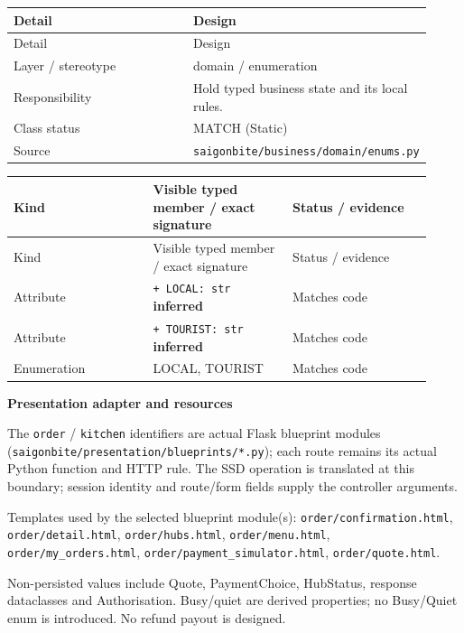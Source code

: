 \begin{longtable}{>{\raggedright\arraybackslash}p{0.4600\linewidth}>{\raggedright\arraybackslash}p{0.4600\linewidth}}
Detail & Design \\
\hline\endfirsthead
Detail & Design \\
\hline\endhead
Layer / stereotype & domain / \guillemotleft{}enumeration\guillemotright{} \\
Responsibility & Hold typed business state and its local rules. \\
Class status & MATCH (Static) \\
Source & \texttt{saigonbite/\allowbreak{}business/\allowbreak{}domain/\allowbreak{}enums.\allowbreak{}py} \\
\end{longtable}
\begin{longtable}{>{\raggedright\arraybackslash}p{0.3067\linewidth}>{\raggedright\arraybackslash}p{0.3067\linewidth}>{\raggedright\arraybackslash}p{0.3067\linewidth}}
Kind & Visible typed member / exact signature & Status / evidence \\
\hline\endfirsthead
Kind & Visible typed member / exact signature & Status / evidence \\
\hline\endhead
Attribute & \texttt{+ LOCAL: str} \textbf{inferred} & Matches code \\
Attribute & \texttt{+ TOURIST: str} \textbf{inferred} & Matches code \\
Enumeration & LOCAL, TOURIST & Matches code \\
\end{longtable}
\textbf{Presentation adapter and resources}

The \texttt{order} / \texttt{kitchen} identifiers are actual Flask blueprint modules (\texttt{saigonbite/\allowbreak{}presentation/\allowbreak{}blueprints/\allowbreak{}*.\allowbreak{}py}); each route remains its actual Python function and HTTP rule. The SSD operation is translated at this boundary; session identity and route/form fields supply the controller arguments.

Templates used by the selected blueprint module(s): \texttt{order/\allowbreak{}confirmation.\allowbreak{}html}, \texttt{order/\allowbreak{}detail.\allowbreak{}html}, \texttt{order/\allowbreak{}hubs.\allowbreak{}html}, \texttt{order/\allowbreak{}menu.\allowbreak{}html}, \texttt{order/\allowbreak{}my\_\allowbreak{}orders.\allowbreak{}html}, \texttt{order/\allowbreak{}payment\_\allowbreak{}simulator.\allowbreak{}html}, \texttt{order/\allowbreak{}quote.\allowbreak{}html}.

Non-persisted values include Quote, PaymentChoice, HubStatus, response dataclasses and Authorisation. Busy/quiet are derived properties; no Busy/Quiet enum is introduced. No refund payout is designed.
